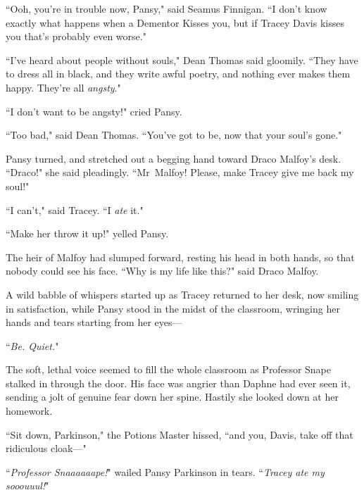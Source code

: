 ``Ooh, you're in trouble now, Pansy," said Seamus Finnigan. ``I don't know exactly what happens when a Dementor Kisses you, but if Tracey Davis kisses you that's probably even worse."

``I've heard about people without souls," Dean Thomas said gloomily. ``They have to dress all in black, and they write awful poetry, and nothing ever makes them happy. They're all \emph{angsty}."

``I don't want to be angsty!" cried Pansy.

``Too bad," said Dean Thomas. ``You've got to be, now that your soul's gone."

Pansy turned, and stretched out a begging hand toward Draco Malfoy's desk. ``Draco!" she said pleadingly. ``Mr~Malfoy! Please, make Tracey give me back my soul!"

``I can't," said Tracey. ``I \emph{ate} it."

``Make her throw it up!" yelled Pansy.

The heir of Malfoy had slumped forward, resting his head in both hands, so that nobody could see his face. ``Why is my life like this?" said Draco Malfoy.

A wild babble of whispers started up as Tracey returned to her desk, now smiling in satisfaction, while Pansy stood in the midst of the classroom, wringing her hands and tears starting from her eyes—

``\emph{Be. Quiet.}"

The soft, lethal voice seemed to fill the whole classroom as Professor Snape stalked in through the door. His face was angrier than Daphne had ever seen it, sending a jolt of genuine fear down her spine. Hastily she looked down at her homework.

``Sit down, Parkinson," the Potions Master hissed, ``and you, Davis, take off that ridiculous cloak—"

``\emph{Professor Snaaaaaape!}" wailed Pansy Parkinson in tears. ``\emph{Tracey ate my sooouuul!}"

